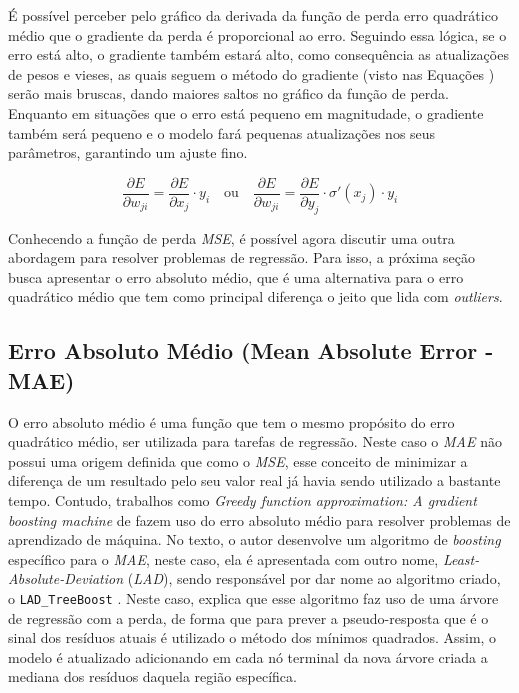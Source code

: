 É possível perceber pelo gráfico da derivada da função de perda erro quadrático médio que o gradiente da perda é proporcional ao erro. Seguindo essa lógica, se o erro está alto, o gradiente também estará alto, como consequência as atualizações de pesos e vieses, as quais seguem o método do gradiente (visto nas Equações ) serão mais bruscas, dando maiores saltos no gráfico da função de perda. Enquanto em situações que o erro está pequeno em magnitudade, o gradiente também será pequeno e o modelo fará pequenas atualizações nos seus parâmetros, garantindo um ajuste fino.

\begin{equation}
    \frac{\partial E}{\partial w_{ji}} = \frac{\partial E}{\partial x_j} \cdot y_i \quad \text{ou} \quad \frac{\partial E}{\partial w_{ji}} = \frac{\partial E}{\partial y_j} \cdot \sigma'(x_j) \cdot y_i
    \label{eq:gradiente-do-erro-em-relacao-a-um-peso-de-um-neuronio-perda-regressao}
\end{equation}

Conhecendo a função de perda \textit{MSE}, é possível agora discutir uma outra abordagem para resolver problemas de regressão. Para isso, a próxima seção busca apresentar o erro absoluto médio, que é uma alternativa para o erro quadrático médio que tem como principal diferença o jeito que lida com \textit{outliers}.

\subsection{Erro Absoluto Médio (Mean Absolute Error - MAE)}

O erro absoluto médio é uma função que tem o mesmo propósito do erro quadrático médio, ser utilizada para tarefas de regressão. Neste caso o \textit{MAE} não possui uma origem definida que como o \textit{MSE}, esse conceito de minimizar a diferença de um resultado pelo seu valor real já havia sendo utilizado a bastante tempo. Contudo, trabalhos como \textit{Greedy function approximation: A gradient boosting machine} de \textcite{GreedyFunctionApproximation} fazem uso do erro absoluto médio para resolver problemas de aprendizado de máquina. No texto, o autor desenvolve um algoritmo de \textit{boosting} específico para o \textit{MAE}, neste caso, ela é apresentada com outro nome, \textit{Least-Absolute-Deviation} (\textit{LAD}), sendo responsável por dar nome ao algoritmo criado, o \texttt{LAD\_TreeBoost} \parencite{GreedyFunctionApproximation}. Neste caso, \textcite{GreedyFunctionApproximation} explica que esse algoritmo faz uso de uma árvore de regressão com a perda, de forma que para prever a pseudo-resposta que é o sinal dos resíduos atuais é utilizado o método dos mínimos quadrados. Assim, o modelo é atualizado adicionando em cada nó terminal da nova árvore criada a mediana dos resíduos daquela região específica.

